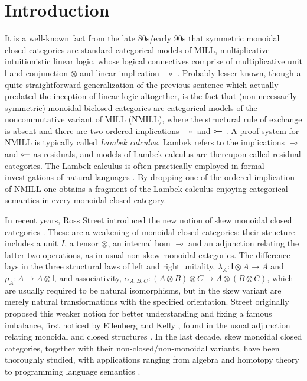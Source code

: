 \documentclass[submission,copyright,creativecommons]{eptcs}
\newcommand{\ot}{\otimes}
\newcommand{\lolli}{\multimap}
\newcommand{\illol}{\rotatebox[origin=c]{180}{$\multimap$}}
\newcommand{\I}{\mathsf{I}}
\begin{document}
\section{Introduction}
It is a well-known fact from the late 80s/early 90s that symmetric monoidal closed categories are standard categorical models of MILL, multiplicative intuitionistic linear logic, whose logical connectives comprise of multiplicative unit $\I$ and conjunction $\ot$ and linear implication $\lolli$ \cite{mellies:categorical:09}. Probably lesser-known, though a quite straightforward generalization of the previous sentence which actually predated the inception of linear logic altogether, is the fact that (non-necessarily symmetric) monoidal biclosed categories are categorical models of the noncommutative variant of MILL (NMILL), where the structural rule of exchange is absent and there are two ordered implications $\lolli$ and $\illol$ \cite{lambek:deductive:68}. A proof system for NMILL is typically called \emph{Lambek calculus}. Lambek refers to the implications $\lolli$ and $\illol$ as residuals, and models of Lambek calculus are thereupon called residual categories. The Lambek calculus is often practically employed in formal investigations of natural languages \cite{lambek:mathematics:58}.
By dropping one of the ordered implication of NMILL one obtains a fragment of the Lambek calculus enjoying categorical semantics in every monoidal closed category.

In recent years, Ross Street introduced the new notion of skew monoidal closed categories \cite{street:skew-closed:2013}. These are a weakening of monoidal closed categories: their structure includes a unit $I$, a tensor $\ot$, an internal hom $\lolli$ and an adjunction relating the latter two operations, as in usual non-skew monoidal categories. The difference lays in the three structural laws of left and right unitality, $\lambda_A : \I \ot A \to A$ and $\rho_A : A \to A \ot \I$, and associativity, $\alpha_{A,B,C} : (A \ot B) \ot C \to A \ot (B \ot C)$, which are usually required to be natural isomorphisms, but in the skew variant are merely natural transformations with the specified orientation. Street originally proposed this weaker notion for better understanding and fixing a famous imbalance, first noticed by Eilenberg and Kelly \cite{eilenberg:closed:1966}, found in the usual adjunction relating monoidal and closed structures \cite{street:skew-closed:2013,uustalu:eilenberg-kelly:2020}. In the last decade, skew monoidal closed categories, together with their non-closed/non-monoidal variants, have been thoroughly studied, with applications ranging from algebra and homotopy theory to programming language semantics \cite{szlachanyi:skew-monoidal:2012,lack:skew:2012,lack:triangulations:2014,altenkirch:monads:2014,buckley:catalan:2015,bourke:skew:2017,bourke:skew:2018,tomita:realizability:21}.
\end{document}
